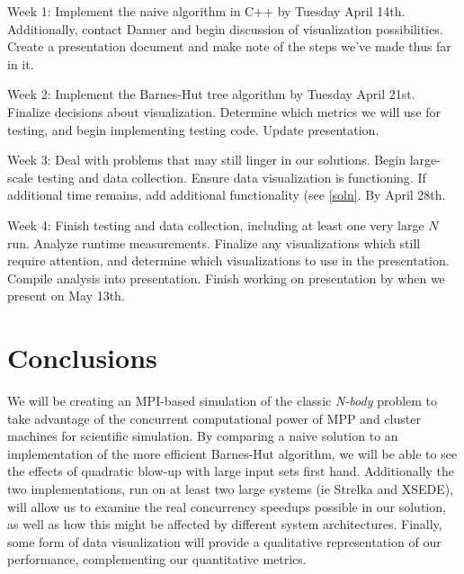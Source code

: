 \documentclass[11pt]{article}
\newenvironment{my_enumerate}{
  \begin{enumerate}
    \setlength{\itemsep}{1pt}
      \setlength{\parskip}{0pt}
\setlength{\parsep}{0pt}}{\end{enumerate}
}
\begin{document}
\begin{my_enumerate}
  \item Week 1: Implement the naive algorithm in C++ by Tuesday April 14th. Additionally, contact Danner and begin discussion of visualization possibilities. Create a presentation document and make note of the steps we've made thus far in it.
  \item Week 2: Implement the Barnes-Hut tree algorithm by Tuesday April 21st. Finalize decisions about visualization. Determine which metrics we will use for testing, and begin implementing testing code. Update presentation.
  \item Week 3: Deal with problems that may still linger in our solutions. Begin large-scale testing and data collection. Ensure data visualization is functioning. If additional time remains, add additional functionality (see \ref{soln}. By April 28th.
  \item Week 4: Finish testing and data collection, including at least one very large $N$ run. Analyze runtime measurements. Finalize any visualizations which still require attention, and determine which visualizations to use in the presentation. Compile analysis into presentation. Finish working on presentation by when we present on May 13th.
\end{my_enumerate}

\section {Conclusions}\label{conclud}
We will be creating an MPI-based simulation of the classic \emph{N-body} problem to take advantage of the concurrent computational power of MPP and cluster machines for scientific simulation. By comparing a naive solution to an implementation of the more efficient Barnes-Hut algorithm, we will be able to see the effects of quadratic blow-up with large input sets first hand. Additionally the two implementations, run on at least two large systems (ie Strelka and XSEDE), will allow us to examine the real concurrency speedups possible in our solution, as well as how this might be affected by different system architectures. Finally, some form of data visualization will provide a qualitative representation of our performance, complementing our quantitative metrics.

\newpage
\onecolumn
\renewcommand\refname{Annotated Bibliography}





\end{document}
